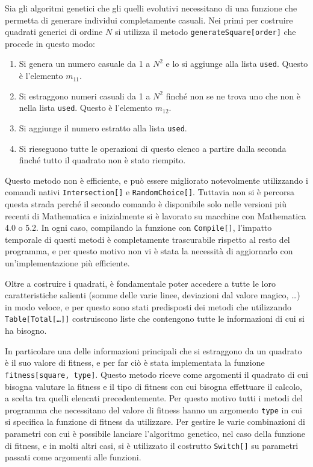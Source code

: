 \documentclass[italian,twoside,twocolumn]{article}
\begin{document}
Sia gli algoritmi genetici che gli quelli evolutivi necessitano di una funzione che permetta di generare individui completamente casuali. Nei primi per costruire quadrati generici di ordine $ N $ si utilizza il metodo \texttt{generateSquare[order]} che procede in questo modo: 
\begin{enumerate}
	\item Si genera un numero casuale da 1 a $ N^2 $ e lo si aggiunge alla lista \texttt{used}. Questo è l'elemento $ m_{11} $.
	\item Si estraggono numeri casuali da 1 a $ N^2 $ finché non se ne trova uno che non è nella lista \texttt{used}. Questo è l'elemento $ m_{12} $. 
	\item Si aggiunge il numero estratto alla lista \texttt{used}.
	\item Si rieseguono tutte le operazioni di questo elenco a partire dalla seconda finché tutto il quadrato non è stato riempito. 
\end{enumerate}
Questo metodo non è efficiente, e può essere migliorato notevolmente utilizzando i comandi nativi \texttt{Intersection[]} e \texttt{RandomChoice[]}. Tuttavia non si è percorsa questa strada perché il secondo comando è disponibile solo nelle versioni più recenti di Mathematica e inizialmente si è lavorato su macchine con Mathematica 4.0 o 5.2. In ogni caso, compilando la funzione con \texttt{Compile[]}, l'impatto temporale di questi metodi è completamente trascurabile rispetto al resto del programma, e per questo motivo non vi è stata la necessità di aggiornarlo con un'implementazione più efficiente.

Oltre a costruire i quadrati, è fondamentale poter accedere a tutte le loro caratteristiche salienti (somme delle varie linee, deviazioni dal valore magico, \dots) in modo veloce, e per questo sono stati predisposti dei metodi che utilizzando \texttt{Table[Total[\dots]]} costruiscono liste che contengono tutte le informazioni di cui si ha bisogno.
	
In particolare una delle informazioni principali che si estraggono da un quadrato è il suo valore di fitness, e per far ciò è stata implementata la funzione \texttt{fitness[square, type]}. Questo metodo riceve come argomenti il quadrato di cui bisogna valutare la fitness e il tipo di fitness con cui bisogna effettuare il calcolo, a scelta tra quelli elencati precedentemente. Per questo motivo tutti i metodi del programma che necessitano del valore di fitness hanno un argomento \texttt{type} in cui si specifica la funzione di fitness da utilizzare. Per gestire le varie combinazioni di parametri con cui è possibile lanciare l'algoritmo genetico, nel caso della funzione di fitness, e in molti altri casi, si è utilizzato il costrutto \texttt{Switch[]} su parametri passati come argomenti alle funzioni. 
\end{document}
